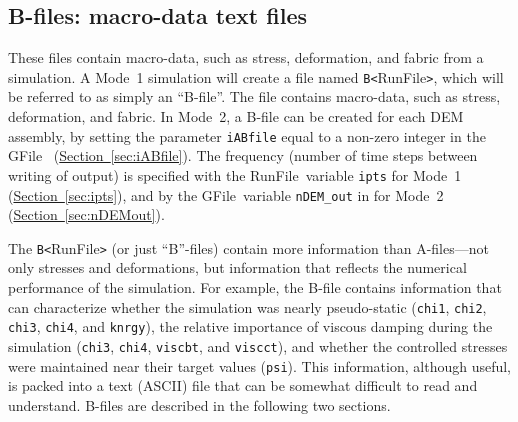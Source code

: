 \documentclass[letterpaper,11pt]{article}
\newcommand{\RunFile}{\textsf{RunFile}}
\newcommand{\GFile}{\textsf{GFile}}
\begin{document}
\subsection{B-files: macro-data text files}\label{sec:Bfiles}
These files contain macro-data, such as stress,
deformation, and fabric from a simulation.
A Mode~1 simulation will create a file named 
\texttt{B<}\textsf{RunFile}\texttt{>}, which 
will be referred to as simply an ``B-file''.
The file contains macro-data, such as stress,
deformation, and fabric.
In Mode~2, a B-file can be created for each DEM assembly,
by setting the parameter \texttt{iABfile} equal to a non-zero
integer in the \GFile\ %
(\hyperref[sec:iABfile]{Section~\ref*{sec:iABfile}}).
The frequency (number of time steps between writing of output)
is specified with the \RunFile\ variable
\texttt{ipts} for Mode~1
(\hyperref[sec:ipts]{Section~\ref*{sec:ipts}}),
and by the \GFile\ variable \texttt{nDEM\_out} in
for Mode~2
(\hyperref[sec:nDEMout]{Section~\ref*{sec:nDEMout}}).
\par
The \texttt{B<}\textsf{RunFile}\texttt{>} (or just ``B''-files)
contain more information than A-files---not only 
stresses and deformations, but information
that reflects the numerical performance of the simulation.
For example, the B-file contains information that can characterize
whether the simulation was nearly pseudo-static
(\texttt{chi1}, \texttt{chi2}, \texttt{chi3}, \texttt{chi4}, and
\texttt{knrgy}), 
the relative importance
of viscous damping during the simulation
(\texttt{chi3}, \texttt{chi4}, \texttt{viscbt}, and \texttt{viscct}),
and whether the controlled stresses
were maintained near their target values (\texttt{psi}).
This information, although useful, is packed into a text (ASCII) file
that can be somewhat difficult to read and understand.
B-files are described in the following two sections.
%
\end{document}
